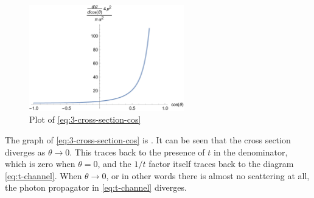 \documentclass[hyperref, a4paper]{article}
\begin{document}
\begin{figure}
    \centering
    \includegraphics[width=0.6\textwidth]{plot-cross-section.pdf}
    \caption{Plot of \eqref{eq:3-cross-section-cos}}
    \label{fig:cross-section-cos}
\end{figure}

The graph of \eqref{eq:3-cross-section-cos} is . It can be seen that the 
cross section diverges as $\theta \to 0$. This traces back to the presence of $t$ in the denominator, which 
is zero when $\theta = 0$, and the $1 / t$ factor itself traces back to the diagram \eqref{eq:t-channel}. 
When $\theta \to 0$, or in other words there is almost no scattering at all, the photon propagator in 
\eqref{eq:t-channel} diverges.
\end{document}
